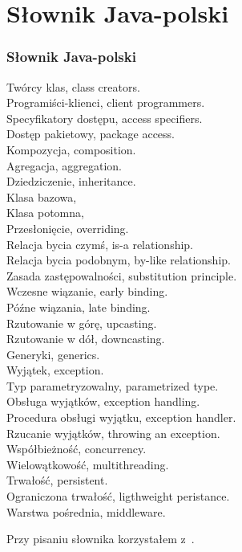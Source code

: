 \documentclass[10pt,t]{beamer}
\begin{document}














\section{Słownik Java-polski}


\begin{frame}
  \frametitle{Słownik Java-polski}

  Twórcy klas, class creators. \\
  Programiści-klienci, client programmers. \\
  Specyfikatory dostępu, access specifiers. \\
  Dostęp pakietowy, package access. \\
  Kompozycja, composition. \\
  Agregacja, aggregation. \\
  Dziedziczenie, inheritance. \\
  Klasa bazowa, \\
  Klasa potomna, \\
  Przesłonięcie, overriding. \\
  Relacja bycia czymś, is-a relationship. \\
  Relacja bycia podobnym, by-like relationship. \\
  Zasada zastępowalności, substitution principle. \\
  Wczesne wiązanie, early binding. \\
  Późne wiązania, late binding. \\
  Rzutowanie w górę, upcasting. \\
  Rzutowanie w dół, downcasting. \\
  Generyki, generics. \\
  Wyjątek, exception. \\
  Typ parametryzowalny, parametrized type. \\
  Obsługa wyjątków, exception handling. \\
  Procedura obsługi wyjątku, exception handler. \\
  Rzucanie wyjątków, throwing an exception. \\
  Współbieżność, concurrency. \\
  Wielowątkowość, multithreading. \\
  Trwałość, persistent. \\
  Ograniczona trwałość, ligthweight peristance. \\
  Warstwa pośrednia, middleware.


  Przy pisaniu słownika korzystałem
  z~\parencite{Eckel-Thinking-in-Java-Ed-polska-Wyd-III-Pub-2003}.

\end{frame}
\end{document}
